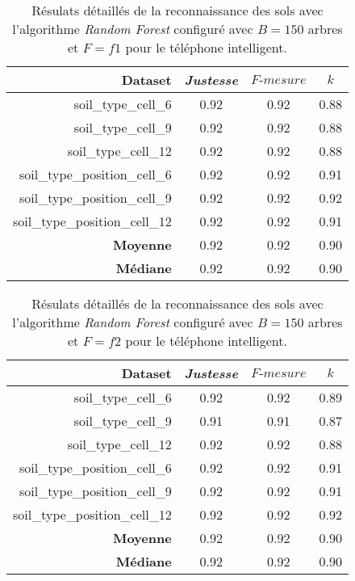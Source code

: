 \begin{table}[H]\renewcommand{\arraystretch}{0.5}
	\centering
	\caption{Résulats détaillés de la reconnaissance des sols avec l'algorithme \textit{Random Forest} configuré avec $B=150$ arbres et $F=f1$ pour le téléphone intelligent.}
	\label{tab:rf-150-f1-cell}
	\begin{tabular}{@{}rccc@{}}
		\toprule
			\textbf{Dataset} & \textit{Justesse} & $F\mbox{-} mesure$ & \textbf{$k$} \\
		\midrule
			soil\_type\_cell\_6 & 0.92 & 0.92 & 0.88 \\
			soil\_type\_cell\_9 & 0.92 & 0.92 & 0.88 \\
			soil\_type\_cell\_12 & 0.92 & 0.92 & 0.88 \\
			soil\_type\_position\_cell\_6 & 0.92 & 0.92 & 0.91 \\
			soil\_type\_position\_cell\_9 & 0.92 & 0.92 & 0.92 \\
			soil\_type\_position\_cell\_12 & 0.92 & 0.92 & 0.91 \\
			\textbf{Moyenne} & 0.92 & 0.92 & 0.90 \\
			\textbf{Médiane} & 0.92 & 0.92 & 0.90 \\
		\bottomrule
	\end{tabular}
\end{table}

\begin{table}[H]\renewcommand{\arraystretch}{0.5}
	\centering
	\caption{Résulats détaillés de la reconnaissance des sols avec l'algorithme \textit{Random Forest} configuré avec $B=150$ arbres et $F=f2$ pour le téléphone intelligent.}
	\label{tab:rf-150-f2-cell}
	\begin{tabular}{@{}rccc@{}}
		\toprule
			\textbf{Dataset} & \textit{Justesse} & $F\mbox{-} mesure$ & \textbf{$k$} \\
		\midrule
			soil\_type\_cell\_6 & 0.92 & 0.92 & 0.89 \\
			soil\_type\_cell\_9 & 0.91 & 0.91 & 0.87 \\
			soil\_type\_cell\_12 & 0.92 & 0.92 & 0.88 \\
			soil\_type\_position\_cell\_6 & 0.92 & 0.92 & 0.91 \\
			soil\_type\_position\_cell\_9 & 0.92 & 0.92 & 0.91 \\
			soil\_type\_position\_cell\_12 & 0.92 & 0.92 & 0.92 \\
			\textbf{Moyenne} & 0.92 & 0.92 & 0.90 \\
			\textbf{Médiane} & 0.92 & 0.92 & 0.90 \\
		\bottomrule
	\end{tabular}
\end{table}

